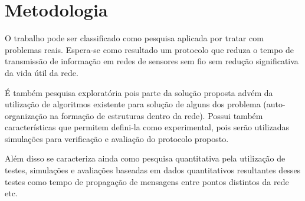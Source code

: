 \chapter{Metodologia}

O trabalho pode ser classificado como pesquisa aplicada por tratar com problemas reais. Espera-se como resultado um protocolo que reduza o tempo de transmissão de informação em redes de sensores sem fio sem redução significativa da vida útil da rede. 

É também pesquisa exploratória pois parte da solução proposta advém da utilização de algoritmos existente para solução de alguns dos problema (auto-organização na formação de estruturas dentro da rede). Possui também características que permitem defini-la como experimental, pois serão utilizadas simulações para verificação e avaliação do protocolo proposto.

Além disso se caracteriza ainda como pesquisa quantitativa pela utilização de testes, simulações e avaliações baseadas em dados quantitativos resultantes desses testes como tempo de propagação de mensagens entre pontos distintos da rede etc.
